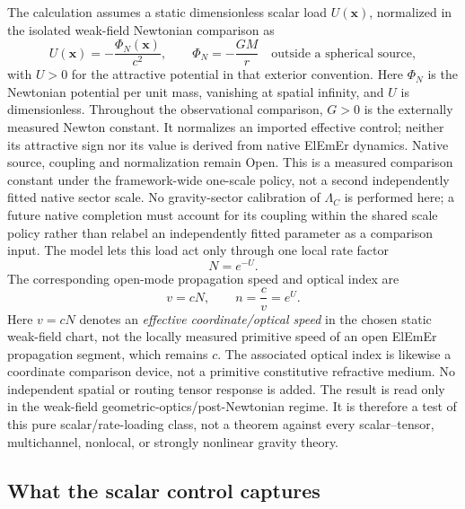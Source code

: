 \documentclass[11pt]{article}
\newcommand{\ElEmEr}{\mbox{ElEmEr}}
\newcommand{\cmc}{c}
\theoremstyle{plain}
\theoremstyle{remark}
\begin{document}
The calculation assumes a static dimensionless scalar load $U(\mathbf x)$,
normalized in the isolated weak-field Newtonian comparison as
\begin{equation}
U(\mathbf x)=-\frac{\Phi_N(\mathbf x)}{\cmc^2},
\qquad \Phi_N=-\frac{GM}{r}
\quad\text{outside a spherical source},
\label{eq:scalar-U-Newton}
\end{equation}
with $U>0$ for the attractive potential in that exterior convention.
Here $\Phi_N$ is the Newtonian potential per unit mass, vanishing at spatial
infinity, and $U$ is dimensionless.  Throughout the observational comparison,
$G>0$ is the externally measured Newton constant.  It normalizes an imported
effective control; neither its attractive sign nor its value is derived from
native ElEmEr dynamics.  Native source, coupling and normalization remain Open.
This is a measured comparison constant under the framework-wide one-scale
policy, not a second independently fitted native sector scale.
No gravity-sector calibration of $\Lambda_C$ is performed here; a future
native completion must account for its coupling within the shared scale policy
rather than relabel an independently fitted parameter as a comparison input.
The
model lets this load act only through one local rate factor
\begin{equation}
N=e^{-U}.
\label{eq:Nscalar}
\end{equation}
The corresponding open-mode propagation speed and optical index are
\begin{equation}
v=\cmc N,
\qquad
n=\frac{\cmc}{v}=e^U.
\label{eq:scalar-index}
\end{equation}
Here $v=\cmc N$ denotes an \emph{effective coordinate/optical speed} in the
chosen static weak-field chart, not the locally measured primitive speed of an
open \ElEmEr{} propagation segment, which remains $\cmc$.  The associated
optical index is likewise a coordinate comparison device, not a primitive
constitutive refractive medium.  No independent spatial or routing tensor
response is added.  The result is read only in the weak-field
geometric-optics/post-Newtonian regime.  It is therefore a test of this
pure scalar/rate-loading class, not a theorem against every scalar--tensor, multichannel,
nonlocal, or strongly nonlinear gravity theory.

\subsection{What the scalar control captures}
\end{document}
